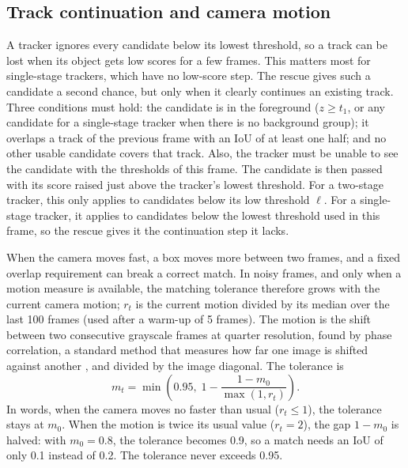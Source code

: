 \documentclass[pdflatex,sn-mathphys-num,iicol]{sn-jnl}
\begin{document}
\subsection{Track continuation and camera motion}\label{sec:rescue}
A tracker ignores every candidate below its lowest threshold, so a track can
be lost when its object gets low scores for a few frames. This matters most
for single-stage trackers, which have no low-score step. The rescue gives
such a candidate a second chance, but only when it clearly continues an
existing track. Three conditions must hold: the candidate is in the
foreground ($z\ge t_1$, or any candidate for a single-stage tracker when
there is no background group); it overlaps a track of the previous frame
with an IoU of at least one half; and no other usable candidate covers that
track. Also, the tracker must be unable to see the candidate with the
thresholds of this frame. The candidate is then passed with its score raised
just above the tracker's lowest threshold. For a two-stage tracker, this only
applies to candidates below its low threshold $\ell$. For a single-stage
tracker, it applies to candidates below the lowest threshold used in this
frame, so the rescue gives it the continuation step it lacks.

When the camera moves fast, a box moves more between two frames, and a fixed
overlap requirement can break a correct match. In noisy frames, and only when
a motion measure is available, the matching tolerance therefore grows with
the current camera motion; $r_t$ is the current motion divided by its median
over the last 100 frames (used after a warm-up of 5 frames). The motion is the shift between two consecutive grayscale
frames at quarter resolution, found by phase correlation, a standard method
that measures how far one image is shifted against another
\cite{reddy1996phasecorr}, and divided by the image diagonal. The tolerance is
\begin{equation}
m_t=\min\!\left(0.95,\;1-\frac{1-m_0}{\max(1,r_t)}\right).
\label{eq:motion}
\end{equation}
In words, when the camera moves no faster than usual ($r_t\le1$), the
tolerance stays at $m_0$. When the motion is twice its usual value
($r_t=2$), the gap $1-m_0$ is halved: with $m_0=0.8$, the tolerance becomes
0.9, so a match needs an IoU of only 0.1 instead of 0.2. The tolerance never
exceeds 0.95.
\end{document}
